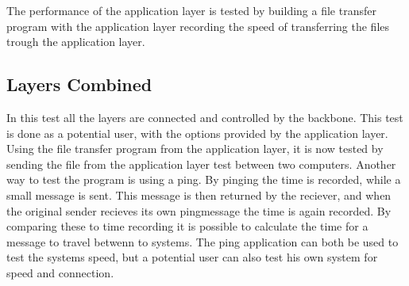 The performance of the application layer is tested by building a file transfer program with the application layer recording the speed of transferring the files trough the application layer.

\subsection{Layers Combined}

In this test all the layers are connected and controlled by the backbone. This test is done as a potential user, with the options provided by the application layer. Using the file transfer program from the application layer, it is now tested by sending the file from the application layer test between two computers. 
Another way to test the program is using a ping. By pinging the time is recorded, while a small message is sent. This message is then returned by the reciever, and when the original sender recieves its own pingmessage the time is again recorded. By comparing these to time recording it is possible to calculate the time for a message to travel betwenn to systems. The ping application can both be used to test the systems speed, but a potential user can also test his own system  for speed and connection.

